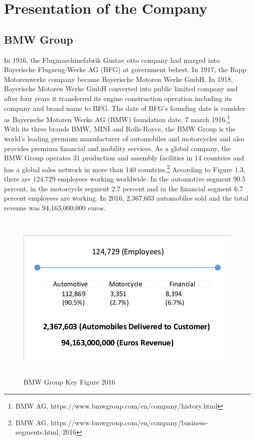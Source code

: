 \section{Presentation of the Company}
\subsection{BMW Group}
In 1916, the Flugmaschinefabrik Gustav otto company had marged into Bayerische Flugzeug-Werke AG (BFG) at government behest. In 1917, the Rapp Motorenwerke company became Bayerische Motoren Werke GmbH. In 1918, Bayerische Motoren Werke GmbH converted into public limited company and after four years it transferred its engine construction operation including its company and brand name to BFG. The date of BFG's founding date is consider as Bayerische Motoren Werke AG (BMW) foundation date, 7 march 1916.\footnote{BMW AG, https://www.bmwgroup.com/en/company/history.html } \newline\\
With its three brands BMW, MINI and Rolls-Royce, the BMW Group is the world’s leading premium manufacturer of automobiles and motorcycles and also provides premium financial and mobility services. As a global company, the BMW Group operates 31 production and assembly facilities in 14 countries and has a global sales network in more than 140 countries.\footnote{BMW AG, https://www.bmwgroup.com/en/company/business-segments.html, 2016} According to Figure 1.3, there are 124,729 employees working worldwide. In the automotive segment 90.5 percent, in the motorcycle segment 2.7 percent and in the financial segment 6.7 percent employees are working. In 2016, 2,367,603 automobiles sold and the total revenue was 94,163,000,000 euros.

\begin{figure}[!ht] 
	\centering
		\includegraphics[width=414pt, height=238pt, width=1.0\textwidth]{images/BMW1.pdf}
	\caption[BMW Group Key Figure 2016]{BMW Group Key Figure 2016\footnotemark}
	\label{fig:BMW1}
\end{figure}
\newpage

